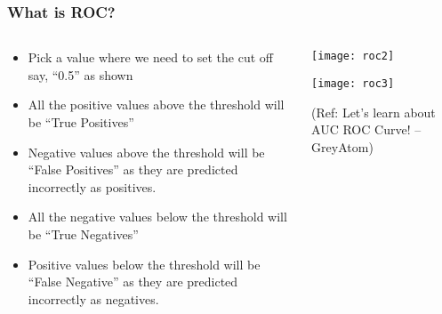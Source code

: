 \begin{frame}[fragile]\frametitle{What is ROC?}

\begin{columns}
\begin{column}[T]{0.5\linewidth}
\begin{itemize}
\item Pick a value where we need to set the cut off say, “0.5” as shown
\item All the positive values above the threshold will be “True Positives”
\item Negative values above the threshold will be “False Positives” as they
are predicted incorrectly as positives.
\item All the negative values below the threshold will be “True Negatives”
\item Positive values below the threshold will be “False Negative” as they
are predicted incorrectly as negatives.
\end{itemize}
\end{column}
\begin{column}[T]{0.5\linewidth}

\begin{center}
\texttt{[image: roc2]}

\texttt{[image: roc3]}
\end{center}

\tiny{(Ref: Let's learn about AUC ROC Curve! – GreyAtom)}
\end{column}

\end{columns}
\end{frame}

